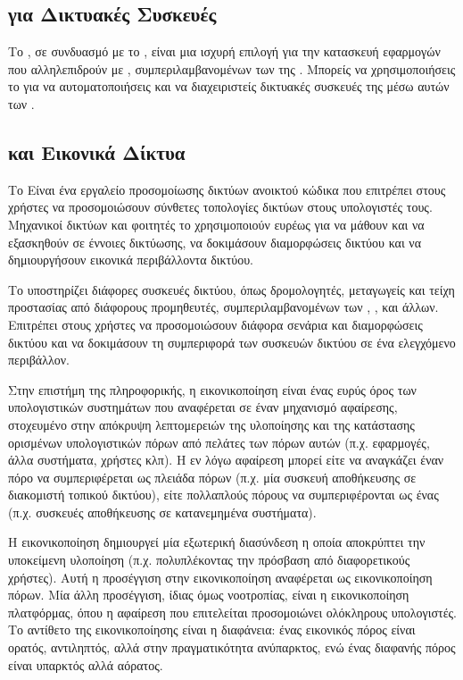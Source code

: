 \subsection{ για Δικτυακές Συσκευές }
Το , σε συνδυασμό με το , είναι μια ισχυρή επιλογή για την κατασκευή  
εφαρμογών που αλληλεπιδρούν με , συμπεριλαμβανομένων των  της . Μπορείς να χρησιμοποιήσεις το  
για να αυτοματοποιήσεις και να διαχειριστείς δικτυακές συσκευές της  μέσω αυτών των .


\subsection{ και Εικονικά Δίκτυα}

Το  Είναι ένα εργαλείο προσομοίωσης δικτύων ανοικτού κώδικα που επιτρέπει στους χρήστες να προσομοιώσουν 
σύνθετες τοπολογίες δικτύων στους υπολογιστές τους. Μηχανικοί δικτύων και φοιτητές 
το χρησιμοποιούν ευρέως για να μάθουν και να εξασκηθούν σε έννοιες δικτύωσης, να δοκιμάσουν διαμορφώσεις δικτύου και να δημιουργήσουν εικονικά περιβάλλοντα δικτύου.


Το  υποστηρίζει διάφορες συσκευές δικτύου, όπως δρομολογητές, μεταγωγείς και τείχη προστασίας 
από διάφορους προμηθευτές, συμπεριλαμβανομένων των , ,  και άλλων. Επιτρέπει στους χρήστες να 
προσομοιώσουν διάφορα σενάρια και διαμορφώσεις δικτύου και να δοκιμάσουν τη συμπεριφορά των 
συσκευών δικτύου σε ένα ελεγχόμενο περιβάλλον. 

Στην επιστήμη της πληροφορικής, η εικονικοποίηση  είναι ένας ευρύς όρος 
των υπολογιστικών συστημάτων που αναφέρεται σε έναν μηχανισμό αφαίρεσης, 
στοχευμένο στην απόκρυψη λεπτομερειών της υλοποίησης και της κατάστασης
ορισμένων υπολογιστικών πόρων από πελάτες των πόρων αυτών 
(π.χ. εφαρμογές, άλλα συστήματα, χρήστες κλπ). 
Η εν λόγω αφαίρεση μπορεί είτε να αναγκάζει έναν πόρο να 
συμπεριφέρεται ως πλειάδα πόρων (π.χ. μία συσκευή αποθήκευσης σε διακομιστή τοπικού δικτύου),
είτε πολλαπλούς πόρους να συμπεριφέρονται ως ένας (π.χ. συσκευές αποθήκευσης σε κατανεμημένα συστήματα). 

Η εικονικοποίηση δημιουργεί μία εξωτερική διασύνδεση η οποία αποκρύπτει την 
υποκείμενη υλοποίηση (π.χ. πολυπλέκοντας την πρόσβαση από διαφορετικούς χρήστες).
Αυτή η προσέγγιση στην εικονικοποίηση αναφέρεται ως εικονικοποίηση πόρων. 
Μία άλλη προσέγγιση, ίδιας όμως νοοτροπίας, είναι η εικονικοποίηση πλατφόρμας,
όπου η αφαίρεση που επιτελείται προσομοιώνει ολόκληρους υπολογιστές. Το αντίθετο της εικονικοποίησης είναι η διαφάνεια: 
ένας εικονικός πόρος είναι ορατός, αντιληπτός, αλλά στην πραγματικότητα ανύπαρκτος, 
ενώ ένας διαφανής πόρος είναι υπαρκτός αλλά αόρατος. 
 
